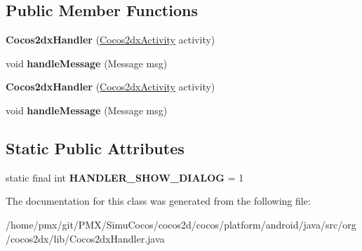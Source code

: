 \subsection*{Public Member Functions}
\begin{DoxyCompactItemize}
\item 
\mbox{\label{classorg_1_1cocos2dx_1_1lib_1_1Cocos2dxHandler_a00b4b27bab56819e14984f4633ed88b4}} 
{\bfseries Cocos2dx\+Handler} (\hyperlink{classorg_1_1cocos2dx_1_1lib_1_1Cocos2dxActivity}{Cocos2dx\+Activity} activity)
\item 
\mbox{\label{classorg_1_1cocos2dx_1_1lib_1_1Cocos2dxHandler_a39ce5066ee906e4bb587d050b7604c3e}} 
void {\bfseries handle\+Message} (Message msg)
\item 
\mbox{\label{classorg_1_1cocos2dx_1_1lib_1_1Cocos2dxHandler_a00b4b27bab56819e14984f4633ed88b4}} 
{\bfseries Cocos2dx\+Handler} (\hyperlink{classorg_1_1cocos2dx_1_1lib_1_1Cocos2dxActivity}{Cocos2dx\+Activity} activity)
\item 
\mbox{\label{classorg_1_1cocos2dx_1_1lib_1_1Cocos2dxHandler_a39ce5066ee906e4bb587d050b7604c3e}} 
void {\bfseries handle\+Message} (Message msg)
\end{DoxyCompactItemize}
\subsection*{Static Public Attributes}
\begin{DoxyCompactItemize}
\item 
\mbox{\label{classorg_1_1cocos2dx_1_1lib_1_1Cocos2dxHandler_a43248a6567597951b09753757d81fb65}} 
static final int {\bfseries H\+A\+N\+D\+L\+E\+R\+\_\+\+S\+H\+O\+W\+\_\+\+D\+I\+A\+L\+OG} = 1
\end{DoxyCompactItemize}


The documentation for this class was generated from the following file\+:\begin{DoxyCompactItemize}
\item 
/home/pmx/git/\+P\+M\+X/\+Simu\+Cocos/cocos2d/cocos/platform/android/java/src/org/cocos2dx/lib/Cocos2dx\+Handler.\+java\end{DoxyCompactItemize}
